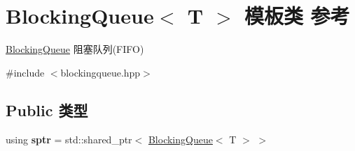 \hypertarget{classBlockingQueue}{}\section{Blocking\+Queue$<$ T $>$ 模板类 参考}
\label{classBlockingQueue}


\hyperlink{classBlockingQueue}{Blocking\+Queue} 阻塞队列(\+F\+I\+F\+O)  




{\ttfamily \#include $<$blockingqueue.\+hpp$>$}

\subsection*{Public 类型}
\begin{DoxyCompactItemize}
\item 
\mbox{\label{classBlockingQueue_a17fd049d4dd6b13f17238c3f3916cde1}} 
using {\bfseries sptr} = std\+::shared\+\_\+ptr$<$ \hyperlink{classBlockingQueue}{Blocking\+Queue}$<$ T $>$ $>$
\end{DoxyCompactItemize}
